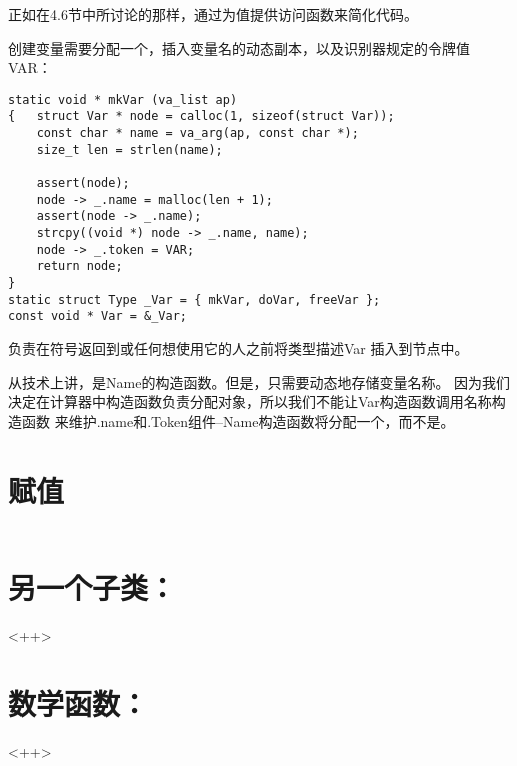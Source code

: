 正如在4.6节中所讨论的那样，通过为值提供访问函数来简化代码。

创建变量需要分配一个，插入变量名的动态副本，以及识别器规定的令牌值VAR：

\begin{lstlisting}
static void * mkVar (va_list ap)
{   struct Var * node = calloc(1, sizeof(struct Var));
    const char * name = va_arg(ap, const char *);
    size_t len = strlen(name);
    
    assert(node);
    node -> _.name = malloc(len + 1);
    assert(node -> _.name);
    strcpy((void *) node -> _.name, name);
    node -> _.token = VAR;
    return node;
}
static struct Type _Var = { mkVar, doVar, freeVar };
const void * Var = &_Var;
\end{lstlisting}

    负责在符号返回到或任何想使用它的人之前将类型描述Var
插入到节点中。

    从技术上讲，是Name的构造函数。但是，只需要动态地存储变量名称。
因为我们决定在计算器中构造函数负责分配对象，所以我们不能让Var构造函数调用名称构造函数
来维护.name和.Token组件--Name构造函数将分配一个，而不是。


\section{赋值}
\begin{lstlisting}
\end{lstlisting}

\section{另一个子类：}<++>

\section{数学函数：}<++>

